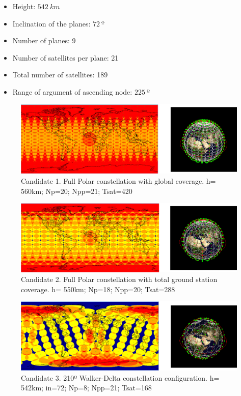 \begin{itemize}
\item Height: $542~{km}$ 
\item Inclination of the planes: $72~{º}$  
\item Number of planes: 9
\item Number of satellites per plane: 21
\item Total number of satellites: 189
\item Range of argument of ascending node: $225~{º}$
\end{itemize}

\begin{figure}[H] %
	\centering
	\includegraphics[width=1\textwidth]{Candidate1.png}
	\caption[Candidate 1. Full Polar constellation with global coverage]{Candidate 1. Full Polar constellation with global coverage.
			 h= 560km; Np=20; Npp=21; Tsat=420 }
	\label{fig:Candidate1}
\end{figure}

\begin{figure}[H] %
	\centering
	\includegraphics[width=1\textwidth]{Candidate2.png}
	\caption[Candidate 2. Full Polar constellation with total ground station coverage]{Candidate 2. Full Polar constellation with total ground station coverage.
			 h= 550km; Np=18; Npp=20; Tsat=288 }
	\label{fig:Candidate2}
\end{figure}

\begin{figure}[H] %
	\centering
	\includegraphics[width=1\textwidth]{Candidate3.png}
	\caption[Candidate 3. 210º Walker-Delta constellation configuration]{Candidate 3. 210º Walker-Delta constellation configuration.
			 h= 542km; in=72; Np=8; Npp=21; Tsat=168 }
	\label{fig:Candidate3}
\end{figure}

